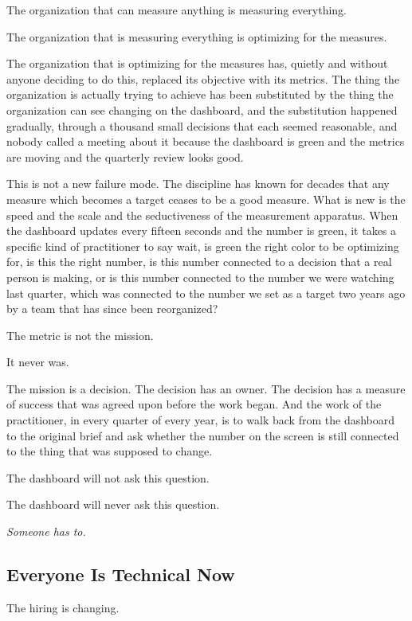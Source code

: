 The organization that can measure anything is measuring everything.

The organization that is measuring everything is optimizing for the measures.

The organization that is optimizing for the measures has, quietly and without anyone deciding to do this, replaced its objective with its metrics. The thing the organization is actually trying to achieve has been substituted by the thing the organization can see changing on the dashboard, and the substitution happened gradually, through a thousand small decisions that each seemed reasonable, and nobody called a meeting about it because the dashboard is green and the metrics are moving and the quarterly review looks good.

This is not a new failure mode. The discipline has known for decades that any measure which becomes a target ceases to be a good measure. What is new is the speed and the scale and the seductiveness of the measurement apparatus. When the dashboard updates every fifteen seconds and the number is green, it takes a specific kind of practitioner to say wait, is green the right color to be optimizing for, is this the right number, is this number connected to a decision that a real person is making, or is this number connected to the number we were watching last quarter, which was connected to the number we set as a target two years ago by a team that has since been reorganized?

The metric is not the mission.

It never was.

The mission is a decision. The decision has an owner. The decision has a measure of success that was agreed upon before the work began. And the work of the practitioner, in every quarter of every year, is to walk back from the dashboard to the original brief and ask whether the number on the screen is still connected to the thing that was supposed to change.

The dashboard will not ask this question.

The dashboard will never ask this question.

\textit{Someone has to.}

\subsection*{Everyone Is Technical Now}

The hiring is changing.

